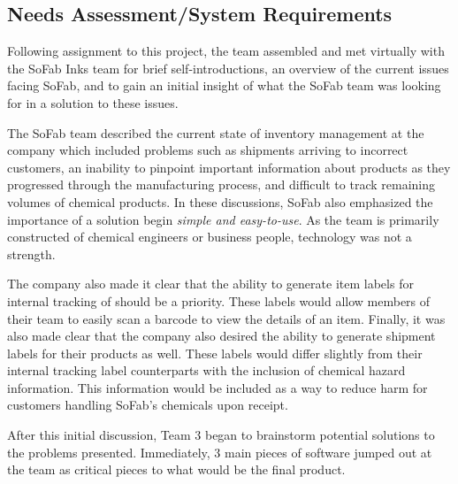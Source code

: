 \documentclass{article}
\begin{document}
\subsection{Needs Assessment\slash System Requirements}
Following assignment to this project, the team assembled and met virtually with the SoFab Inks team for brief self-introductions, 
an overview of the current issues facing SoFab, and to gain an initial insight of what the SoFab team was looking for in a
solution to these issues. 

The SoFab team described the current state of inventory management at the company which included problems such as shipments arriving 
to incorrect customers, an inability to pinpoint important information about products as they progressed through the manufacturing 
process, and difficult to track remaining volumes of chemical products. In these discussions, SoFab also emphasized the importance 
of a solution begin \textit{simple and easy-to-use}. As the team is primarily constructed of chemical engineers or business people, 
technology was not a strength. 

The company also made it clear that the ability to generate item labels for internal tracking of 
should be a priority. These labels would allow members of their team to easily scan a barcode to view the details of an item. Finally, 
it was also made clear that the company also desired the ability to generate shipment labels for their products as well. These labels 
would differ slightly from their internal tracking label counterparts with the inclusion of chemical hazard information. This information
would be included as a way to reduce harm for customers handling SoFab's chemicals upon receipt.

After this initial discussion, Team 3 began to brainstorm potential solutions to the problems presented. Immediately, 3 main 
pieces of software jumped out at the team as critical pieces to what would be the final product.
\end{document}
